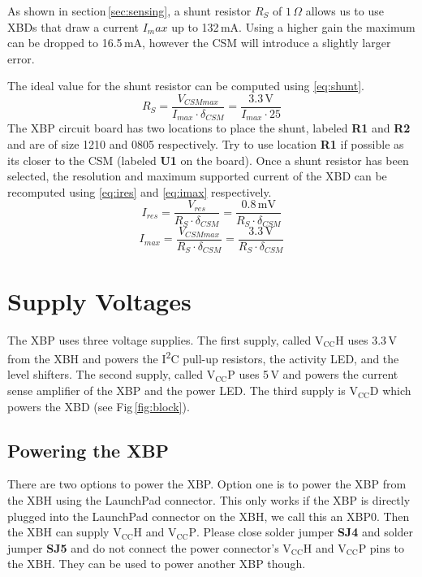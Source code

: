 \documentclass[twoside,11pt]{cergdoc}
\newcommand{\ITwoC}{I\textsuperscript{2}C }
\begin{document}
As shown in section\,\ref{sec:sensing}, a shunt resistor $R_S$ of $1\,\Omega$
allows us to use XBDs that draw a current $I_max$ up to 132\,mA. Using a higher 
gain the maximum can be dropped to 16.5\,mA, however the CSM will introduce a 
slightly larger error. 

The ideal value for the shunt resistor can be computed using \eqref{eq:shunt}.
%
\begin{equation}
  R_S = \frac{V_{CSMmax}}{I_{max} \cdot \delta_{CSM}} = \frac{3.3\,\mathrm{V}}{I_{max} \cdot 25}\label{eq:shunt}
\end{equation}
%
The XBP circuit board has two locations to place the shunt, labeled \textbf{R1} 
and \textbf{R2} and are of size 1210 and 0805 respectively. Try to use location 
\textbf{R1} if possible as its closer to the CSM (labeled \textbf{U1} on the board).
Once a shunt resistor has been selected, the resolution and maximum supported current of the XBD can be
recomputed using \eqref{eq:ires} and \eqref{eq:imax} respectively. 
%
\begin{equation}
  I_{res} = \frac{V_{res}}{R_S \cdot \delta_{CSM}} = \frac{0.8\,\mathrm{mV}}{R_S \cdot \delta_{CSM}}\label{eq:ires}
\end{equation}
\begin{equation}
  I_{max} = \frac{V_{CSMmax}}{R_S \cdot \delta_{CSM}} = \frac{3.3\,\mathrm{V}}{R_S \cdot \delta_{CSM}}\label{eq:imax}
\end{equation}

\section{Supply Voltages}
The XBP uses three voltage supplies. The first supply, called $\mathrm{V_{CC}H}$
uses 3.3\,V from the XBH and powers the \ITwoC pull-up resistors, the activity LED, 
and the level shifters.
The second supply, called $\mathrm{V_{CC}P}$ uses 5\,V and powers the current
sense amplifier of the XBP and the power LED. 
The third supply is $\mathrm{V_{CC}D}$ which powers the XBD (see Fig\,\ref{fig:block}).

\subsection{Powering the XBP}
There are two options to power the XBP. Option one is to power the XBP from the
XBH using the LaunchPad connector. This only works if the XBP is directly plugged into the 
LaunchPad connector on the XBH, 
we call this an XBP0. Then the XBH can supply $\mathrm{V_{CC}H}$ and $\mathrm{V_{CC}P}$.
Please close solder jumper \textbf{SJ4} and solder jumper \textbf{SJ5} and do not connect
the power connector's $\mathrm{V_{CC}H}$ and $\mathrm{V_{CC}P}$ pins to the XBH. 
They can be used to power another XBP though.
\end{document}
